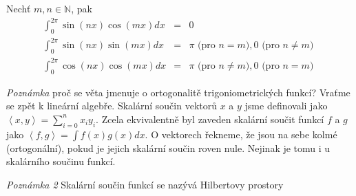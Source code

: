 \begin{vetal}
\label{o ortogonalitě trigoniometrických funkcí}
Nechť $m, n \in \mathbb{N}$, pak
\begin{eqnarray*}
\int_{0}^{2 \pi} \sin (nx) \cos (mx) dx & = & 0 \\
\int_{0}^{2 \pi} \sin (nx) \sin (mx) dx & = & \pi \textrm{ (pro $n=m$)}, 0 \textrm{ (pro $n \neq m$) } \\
\int_{0}^{2 \pi} \cos (nx) \cos (mx) dx & = & \pi \textrm{ (pro $n \neq m$)}, 0 \textrm{ (pro $n=m$)} 
\end{eqnarray*}
\end{vetal}

\emph{Poznámka} proč se věta jmenuje o ortogonalitě trigoniometrických funkcí? Vraťme se zpět k lineární algebře. Skalární součin vektorů $x$ a $y$ jsme definovali jako $\left\langle x,y \right\rangle = \sum_{i=0}^{n} x_i y_i$. Zcela ekvivalentně byl zaveden skalární součit funkcí $f$ a $g$ jako $\left\langle f, g \right\rangle = \int f(x) g(x) dx$. O vektorech řekneme, že jsou na sebe kolmé (ortogonální), pokud je jejich skalární součin roven nule. Nejinak je tomu i u skalárního součinu funkcí. 

\emph{Poznámka 2} Skalární součin funkcí se nazývá Hilbertovy prostory


